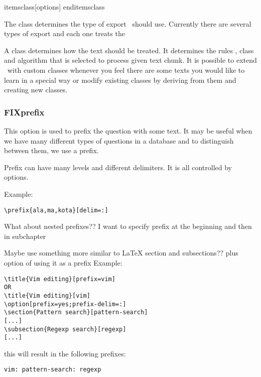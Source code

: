 \documentclass[a4paper,11pt]{article}
\newcommand{\probe}{\emph{\sc{probe{}}}}
\begin{document}
 items{class}[options]
 enditems{class}

The {class} determines the type of export \probe\ should use. Currently
there are several types of export and each one treats the

A class determines how the text should be treated. It determines the rules ,
class and algorithm that is selected to process given text chunk.  It is
possible to extend \probe\ with custom classes whenever you feel there are
some texts you would like to learn in a special way or modify existing classes
by deriving from them and creating new classes.


\subsubsection{FIXprefix}
This option is used to prefix the question with some text. It may be useful
when we have many different types of questions in a database and to distinguish
between them, we use a prefix.

Prefix can have many levels and different delimiters. It is all controlled by
options.

Example:
\begin{verbatim}
\prefix{ala,ma,kota}[delim=:]
\end{verbatim}

What about nested prefixes??
I want to specify prefix at the beginning and then in subchapter

Maybe use something more similar to LaTeX section and subsections??
plus option of using it as a prefix
Example:
\begin{verbatim}
\title{Vim editing}[prefix=vim]
OR
\title{Vim editing}[vim]
\option[prefix=yes;prefix-delim=:]
\section{Pattern search}[pattern-search]
[...]
\subsection{Regexp search}[regexp]
[...]
\end{verbatim}

this will result in the following prefixes:
\begin{verbatim}
vim: pattern-search: regexp

\end{verbatim}
\end{document}
